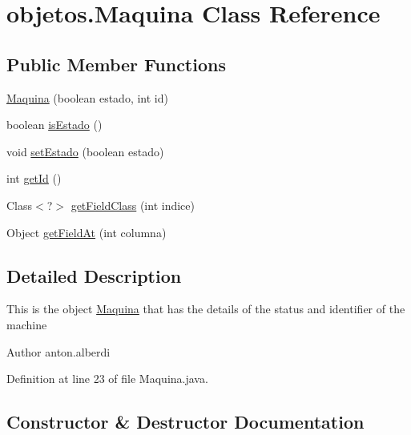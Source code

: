 \hypertarget{classobjetos_1_1_maquina}{}\section{objetos.\+Maquina Class Reference}
\label{classobjetos_1_1_maquina}
\subsection*{Public Member Functions}
\begin{DoxyCompactItemize}
\item 
\mbox{\hyperlink{classobjetos_1_1_maquina_abe32f06ca4367bea60d592d504a7a359}{Maquina}} (boolean estado, int id)
\item 
boolean \mbox{\hyperlink{classobjetos_1_1_maquina_a03b4c97926e8db81a5a28459293c16b6}{is\+Estado}} ()
\item 
void \mbox{\hyperlink{classobjetos_1_1_maquina_a8a5d703c85d9a8a4a7ff352b01ff085b}{set\+Estado}} (boolean estado)
\item 
int \mbox{\hyperlink{classobjetos_1_1_maquina_aca30cab810f1072e9ab07024d6f97cc6}{get\+Id}} ()
\item 
Class$<$?$>$ \mbox{\hyperlink{classobjetos_1_1_maquina_a8ecfb51ac52f34402a48c572aa710297}{get\+Field\+Class}} (int indice)
\item 
Object \mbox{\hyperlink{classobjetos_1_1_maquina_ab50c4dec88d2de79313a9a369df0ffd3}{get\+Field\+At}} (int columna)
\end{DoxyCompactItemize}


\subsection{Detailed Description}
This is the object \mbox{\hyperlink{classobjetos_1_1_maquina}{Maquina}} that has the details of the status and identifier of the machine

\begin{DoxyAuthor}{Author}
anton.\+alberdi 
\end{DoxyAuthor}


Definition at line 23 of file Maquina.\+java.



\subsection{Constructor \& Destructor Documentation}
\mbox{\label{classobjetos_1_1_maquina_abe32f06ca4367bea60d592d504a7a359}} 
